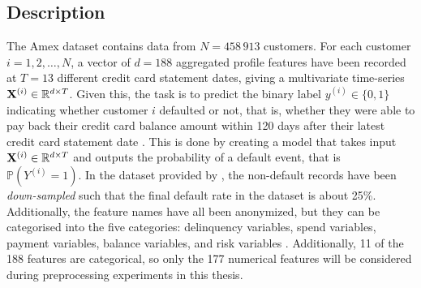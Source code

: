 \documentclass{statsmsc}
\begin{document}
{%
\subsection{Description}%
\label{sub:Description}

The Amex dataset contains data from $N=458\,913$ customers. For each customer
$i=1,2,\dots,N$, a vector of $d=188$ aggregated profile features have been
recorded at $T=13$ different credit card statement dates, giving a multivariate
time-series $\mathbf{X}^{(i)}\in \mathbb{R}^{d \times T}$. Given this, the task is to predict
the binary label $y^{(i)} \in \{0,1\}$ indicating whether customer $i$
defaulted or not, that is, whether they were able to pay back their credit card
balance amount within 120 days after their latest credit card statement date
\citep{amex-data}. This is done by creating a model that takes input
$\mathbf{X}^{(i)} \in \mathbb{R}^{d \times T}$ and outputs the probability of a default
event, that is $\mathbb{P}(Y^{(i)}=1)$.  In the dataset provided by
\cite{amex-data}, the non-default records have been \textit{down-sampled} such
that the final default rate in the dataset is about 25\%.  Additionally, the
feature names have all been anonymized, but they can be categorised into the
five categories: delinquency variables, spend variables, payment variables,
balance variables, and risk variables \citep{amex-data}.  Additionally, 11 of
the 188 features are categorical, so only the 177 numerical features will be
considered during preprocessing experiments in this thesis.

}
\end{document}
